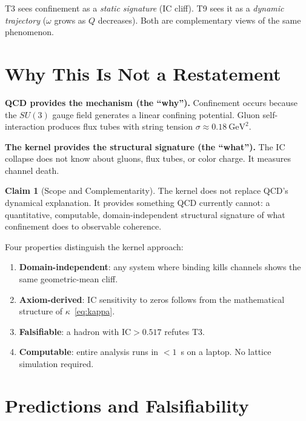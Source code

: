 \documentclass[11pt,a4paper]{article}
\theoremstyle{plain}
\theoremstyle{definition}
\newtheorem{claim}{Claim}
\theoremstyle{remark}
\newcommand{\IC}{\mathrm{IC}}
\begin{document}
T3 sees confinement as a \emph{static signature} (IC cliff).
T9 sees it as a \emph{dynamic trajectory} ($\omega$ grows as
$Q$ decreases).  Both are complementary views of the same
phenomenon.


\section{Why This Is Not a Restatement}\label{sec:novelty}

\textbf{QCD provides the mechanism (the ``why'').}
Confinement occurs because the $SU(3)$ gauge field generates a
linear confining potential.  Gluon self-interaction produces
flux tubes with string tension
$\sigma \approx 0.18~\mathrm{GeV}^2$.

\textbf{The kernel provides the structural signature
(the ``what'').}  The IC collapse does not know about gluons,
flux tubes, or color charge.  It measures channel death.

\begin{claim}[Scope and Complementarity]\label{claim:scope}
The kernel does not replace QCD's dynamical explanation.  It
provides something QCD currently cannot: a quantitative,
computable, domain-independent structural signature of what
confinement does to observable coherence.
\end{claim}

Four properties distinguish the kernel approach:
\begin{enumerate}
\item \textbf{Domain-independent}: any system where binding kills
  channels shows the same geometric-mean cliff.
\item \textbf{Axiom-derived}: IC sensitivity to zeros follows
  from the mathematical structure of
  $\kappa$~\eqref{eq:kappa}.
\item \textbf{Falsifiable}: a hadron with
  $\IC > 0.517$ refutes T3.
\item \textbf{Computable}: entire analysis runs in $<1$~s on a
  laptop.  No lattice simulation required.
\end{enumerate}


\section{Predictions and Falsifiability}\label{sec:predictions}
\end{document}
